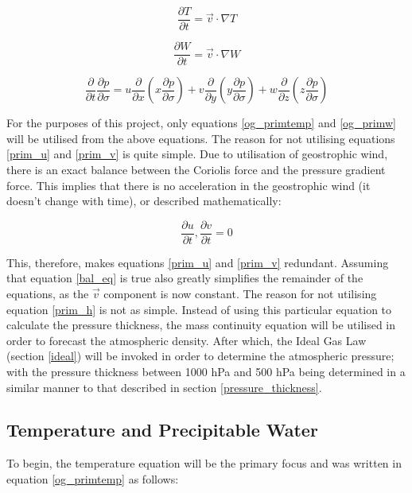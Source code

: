 \begin{equation}
    \frac{\partial T}{\partial t} = \Vec{v} \cdot \nabla T
    \label{og_primtemp}
\end{equation}

\begin{equation}
    \frac{\partial W}{\partial t} = \Vec{v} \cdot \nabla W
    \label{og_primw}
\end{equation}

\begin{equation}
    \frac{\partial}{\partial t} \frac{\partial p}{\partial \sigma} = u \frac{\partial}{\partial x} \left( x \frac{\partial p}{\partial \sigma} \right) + v \frac{\partial}{\partial y} \left( y \frac{\partial p}{\partial \sigma} \right) + w \frac{\partial}{\partial z} \left( z \frac{\partial p}{\partial \sigma} \right)
    \label{prim_h}
\end{equation}

For the purposes of this project, only equations \ref{og_primtemp} and \ref{og_primw} will be utilised from the above equations. The reason for not utilising equations \ref{prim_u} and \ref{prim_v} is quite simple. Due to utilisation of geostrophic wind, there is an exact balance between the Coriolis force and the pressure gradient force. This implies that there is no acceleration in the geostrophic wind (it doesn't change with time), or described mathematically:

\begin{equation}
    \frac{\partial u}{\partial t}, \frac{\partial v}{\partial t} = 0
    \label{bal_eq}
\end{equation}

This, therefore, makes equations \ref{prim_u} and \ref{prim_v} redundant. Assuming that equation \ref{bal_eq} is true also greatly simplifies the remainder of the equations, as the $\Vec{v}$ component is now constant. The reason for not utilising equation \ref{prim_h} is not as simple. Instead of using this particular equation to calculate the pressure thickness, the mass continuity equation will be utilised in order to forecast the atmospheric density. After which, the Ideal Gas Law (section \ref{ideal}) will be invoked in order to determine the atmospheric pressure; with the pressure thickness between 1000 hPa and 500 hPa being determined in a similar manner to that described in section \ref{pressure_thickness}.  

\subsection{Temperature and Precipitable Water}\label{temp_pwv_section}
To begin, the temperature equation will be the primary focus and was written in equation \ref{og_primtemp} as follows:


